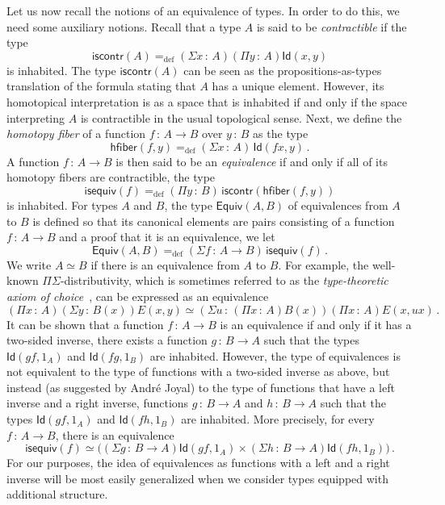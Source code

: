 \documentclass[10pt,a4paper,oneside,reqno]{amsart}
\numberwithin{equation}{section}
\theoremstyle{mythm}
\theoremstyle{mydef}
\theoremstyle{myrmk}
\newcommand{\ie}{\text{i.e.\ }}
\newcommand{\defeq}{=_{\mathrm{def}}}
\newcommand{\co}{\,{:}\,}
\newcommand{\hfiber}{\mathsf{hfiber}}
\newcommand{\iscontr}{\mathsf{iscontr}}
\newcommand{\isequiv}{\mathsf{isequiv}}
\newcommand{\Eq}{\mathsf{Equiv}}
\newcommand{\Id}{\mathsf{Id}}
\begin{document}
Let us now recall the notions of an equivalence of types. In order to do this, we need some auxiliary notions. Recall that a type $A$ is said to be \emph{contractible} if the  type 
 \begin{equation}
 \label{eq:contractible}
\iscontr(A) \defeq (\Sigma x\co A) (\Pi y\co A) \Id(x,y)
\end{equation}
is inhabited. The type $\iscontr(A)$ can be seen as the propositions-as-types translation
of the formula stating that $A$ has a unique element. However, its homotopical interpretation 
is as a space that is inhabited if and only if the space interpreting $A$ is contractible in the usual
topological sense. Next, we define the \emph{homotopy fiber} of a function $f \co A \to B$ over $y \co B$ as the type
\[
 \hfiber(f,y) \defeq (\Sigma x \co A)\, \Id(f x, y) \, .
\]
A function $f \co A \to B$ is then  said to be an \emph{equivalence} if and only if all of its homotopy fibers are contractible, \ie the type
\[
\isequiv(f) \defeq (\Pi y \co B) \, \iscontr(\hfiber(f,y)) 
\]
is inhabited.  For types $A$ and $B$, the type $\Eq(A,B)$ of equivalences from $A$ to $B$ is  defined so that its canonical elements are pairs consisting of a function $f \co A \to B$ and a proof that it is an equivalence, \ie we let 
 \begin{equation}
 \label{equ:weq}
 \Eq(A,B) \defeq (\Sigma f \co A \to B) \, \isequiv(f) \, .
 \end{equation}
 We write $A\simeq B$ if there is an equivalence from $A$ to $B$. For example, the well-known $\Pi\Sigma$-distributivity, which is sometimes referred to as the \emph{type-theoretic axiom of choice}~\cite{MartinLofP:inttt}, can be expressed as an equivalence 
 \begin{equation}
 \label{equ:ac}
 (\Pi x \co A)(\Sigma y \co B(x)) E(x,y) \simeq 
 (\Sigma u  \co (\Pi x \co A)B(x)) (\Pi x \co A) E(x, ux) \, .
 \end{equation}
 It can be shown that a function $f \co A \rightarrow B$ is an equivalence if and only if it has a two-sided inverse,
 \ie there exists a function $g \co B \to A$ such that the types $\Id(gf, 1_A)$
 and $\Id(fg, 1_B)$ are inhabited. However, the type of equivalences is not equivalent to
 the type of functions with a two-sided inverse as above, but instead (as suggested by Andr\'e Joyal) 
to the type of functions that have a left inverse and a right inverse, \ie functions
$g \co B \to A$ and $h \co B \to A$ such that the  types $ \Id(g  f, 1_A)$ and $\Id(f h, 1_B)$ are inhabited. 
More precisely, for every $f \co A \to B$, there is an equivalence
\begin{equation}
\label{equ:equivalternative}
\isequiv(f) \simeq 
 \big( 
 (\Sigma g \co B \to A) \Id(gf, 1_A) \times (\Sigma h \co B \to A) \Id(fh, 1_B) 
 \big) \, .
 \end{equation}
For our purposes, the idea of equivalences as functions with a left and a right inverse will be most
easily generalized when we consider types equipped with additional structure.
\end{document}
